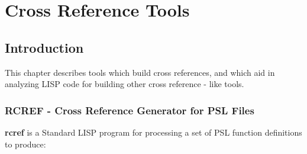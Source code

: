 \chapter*{Cross Reference Tools}

\section{Introduction}

  This chapter describes tools which build cross references, and
which aid in  analyzing  LISP  code  for  building  other  cross
reference - like tools.

\subsection{RCREF - Cross Reference Generator for PSL Files}

{\bf rcref} is a Standard LISP program for processing a set of PSL
function definitions to produce:

